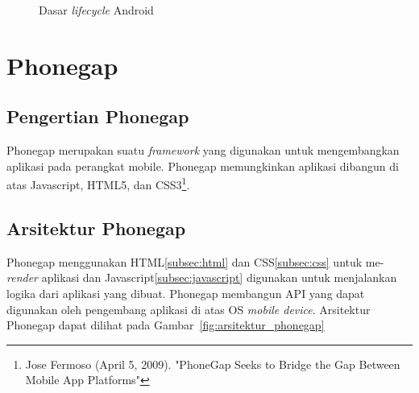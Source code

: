 \begin{figure}
\centering
{}
\caption[Dasar \textit{lifecycle} Android]{Dasar \textit{lifecycle} Android} 
\label{fig:dasar_lifecycle_android}
\end{figure}

\section{Phonegap}
\label{sec:phonegap}

\subsection{Pengertian Phonegap}
\label{sec:pengertianphonegap}

Phonegap merupakan suatu \textit{framework} yang digunakan untuk mengembangkan aplikasi pada perangkat mobile. Phonegap memungkinkan aplikasi dibangun di atas Javascript, HTML5, dan CSS3\footnote{Jose Fermoso (April 5, 2009). "PhoneGap Seeks to Bridge the Gap Between Mobile App Platforms"}.

\subsection{Arsitektur Phonegap}
\label{sec:arsitekturphoengap}

Phonegap menggunakan HTML\ref{subsec:html} dan CSS\ref{subsec:css} untuk me-\textit{render} aplikasi dan Javascript\ref{subsec:javascript} digunakan untuk menjalankan logika dari aplikasi yang dibuat. Phonegap membangun API yang dapat digunakan oleh pengembang aplikasi di atas OS \textit{mobile device}. Arsitektur Phonegap dapat dilihat pada Gambar~\ref{fig:arsitektur_phonegap} 

